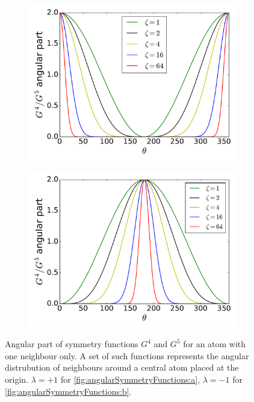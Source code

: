 \documentclass[twoside,english]{uiofysmaster}
\begin{document}
\begin{figure}[H]
  \begin{subfigure}[b]{0.5\linewidth}
    \centering
    \includegraphics[width=\linewidth]{Figures/Theory/G4G5angular1.pdf}
    \subcaption{}
    \label{fig:angularSymmetryFunctions:a} 
  \end{subfigure}%
  \begin{subfigure}[b]{0.5\linewidth}
    \centering
    \includegraphics[width=\linewidth]{Figures/Theory/G4G5angular2.pdf} 
    \subcaption{}
    \label{fig:angularSymmetryFunctions:b} 
  \end{subfigure} 
  \caption{Angular part of symmetry functions $G^4$ and $G^5$ for an atom with one neighbour only. A set of such 
	   functions represents the angular distrubution of neighbours around a central atom placed at the origin.
	   $\lambda = +1$ for \autoref{fig:angularSymmetryFunctions:a}, $\lambda=-1$ for \autoref{fig:angularSymmetryFunctions:b}.}
 \label{fig:angularSymmetryFunctions} 
\end{figure}
\end{document}

